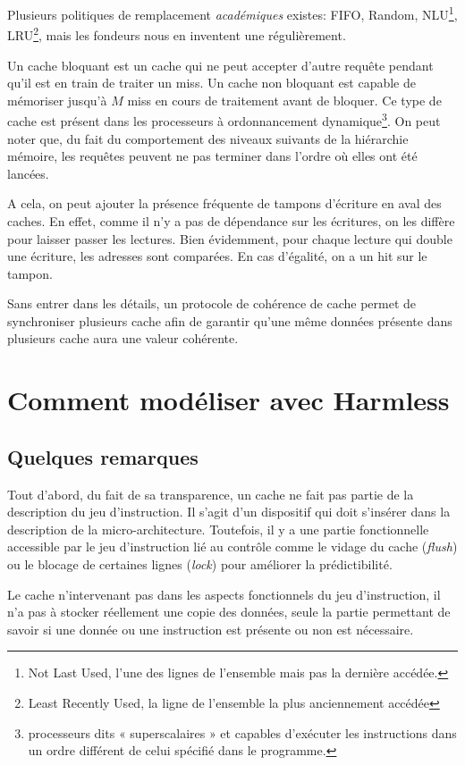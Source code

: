 \documentclass[11pt,a4paper]{article}
\begin{document}
Plusieurs politiques de remplacement {\it académiques} existes: FIFO, Random, NLU\footnote{Not Last Used, l'une des lignes de l'ensemble mais pas la dernière accédée.}, LRU\footnote{Least Recently Used, la ligne de l'ensemble la plus anciennement accédée}, mais les fondeurs nous en inventent une régulièrement.

Un cache bloquant est un cache qui ne peut accepter d'autre requête pendant qu'il est en train de traiter un miss. Un cache non bloquant est capable de mémoriser jusqu'à $M$ miss en cours de traitement avant de bloquer. Ce type de cache est présent dans les processeurs à ordonnancement dynamique\footnote{processeurs dits « superscalaires » et capables d'exécuter les instructions dans un ordre différent de celui spécifié dans le programme.}. On peut noter que, du fait du comportement des niveaux suivants de la hiérarchie mémoire, les requêtes peuvent ne pas terminer dans l'ordre où elles ont été lancées.

A cela, on peut ajouter la présence fréquente de tampons d'écriture en aval des caches. En effet, comme il n'y a pas de dépendance sur les écritures, on les diffère pour laisser passer les lectures. Bien évidemment, pour chaque lecture qui double une écriture, les adresses sont comparées. En cas d'égalité, on a un hit sur le tampon.

Sans entrer dans les détails, un protocole de cohérence de cache permet de synchroniser plusieurs cache afin de garantir qu'une même données présente dans plusieurs cache aura une valeur cohérente.

\section{Comment modéliser avec Harmless}

\subsection{Quelques remarques}

Tout d'abord, du fait de sa transparence, un cache ne fait pas partie de la description du jeu d'instruction. Il s'agit d'un dispositif qui doit s'insérer dans la description de la micro-architecture. Toutefois, il y a une partie fonctionnelle accessible par le jeu d'instruction lié au contrôle comme le vidage du cache (\emph{flush}) ou le blocage de certaines lignes (\emph{lock}) pour améliorer la prédictibilité.

Le cache n'intervenant pas dans les aspects fonctionnels du jeu d'instruction, il n'a pas à stocker réellement une copie des données, seule la partie permettant de savoir si une donnée ou une instruction est présente ou non est nécessaire.
\end{document}
